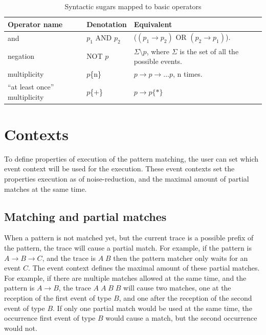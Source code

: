 \begin{table}
	\caption{Syntactic sugars mapped to basic operators}		
	\label{tab:cep:veplsugartobasic}
	\begin{tabularx}{\textwidth}{llX}
		\toprule
		Operator name                  & Denotation      & Equivalent                                                                                            \\ \midrule
		and                            & $p_1$ AND $p_2$ & ($(p_1 \rightarrow p_2)$ OR $(p_2 \rightarrow p_1)$).                                                 \\
		negation                       & NOT $p$         & $\Sigma \setminus p$, where $\Sigma$ is the set of all the possible events.  \\
		multiplicity                   & $p$\{n\}        & $p \rightarrow p \rightarrow \dots p$, n times.                                                       \\
		``at least once'' multiplicity & $p$\{+\}        & $p \rightarrow p\{\ast\}$                                                                             \\ \bottomrule
	\end{tabularx}
\end{table}

\needspace{5cm}
\section{Contexts}

To define properties of execution of the pattern matching, the user can set which event context will be used for the execution.
These event contexts set the properties execution as of noise-reduction, and the maximal amount of partial matches at the same time.

\subsection{Matching and partial matches}
When a pattern is not matched yet, but the current trace is a possible prefix of the pattern, the trace will cause a partial match.
For example, if the pattern is $A \rightarrow B \rightarrow C$, and the trace is $A\;B$ then the pattern matcher only waits for an event $C$.
The event context defines the maximal amount of these partial matches.
For example, if there are multiple matches allowed at the same time, and the pattern is $A \rightarrow B$, the trace $A\;A\;B\;B$ will cause two matches, one at the reception of the first event of type $B$, and one after the reception of the second event of type $B$. 
If only one partial match would be used at the same time, the occurrence  first event of type $B$ would cause a match, but the second occurrence  would not.



